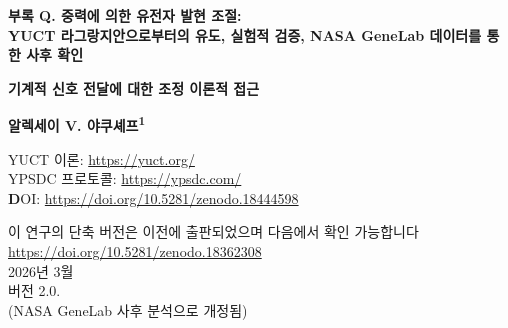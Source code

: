 \documentclass[12pt,a4paper]{article}
\theoremstyle{remark}
\begin{document}
	
	\begin{titlepage}
		\begin{center}
			\vspace*{1cm}
			
			\Huge\textbf{부록 Q. 중력에 의한 유전자 발현 조절: \\ YUCT 라그랑지안으로부터의 유도, 실험적 검증, NASA GeneLab 데이터를 통한 사후 확인}
			
			\vspace{0.5cm}
			\Large\textbf{기계적 신호 전달에 대한 조정 이론적 접근}
			
			\vspace{1.5cm}
			
			\Large\textbf{알렉세이 V. 야쿠셰프\textsuperscript{1}}
			
			YUCT 이론: \url{https://yuct.org/}\\
			YPSDC 프로토콜: \url{https://ypsdc.com/}\\
			
			\vspace{2cm}
			\textbf DOI: \url{https://doi.org/10.5281/zenodo.18444598}\\
			
			\vspace{1cm}
			
			\vspace{0cm}
			\large 
			이 연구의 단축 버전은 이전에 출판되었으며 다음에서 확인 가능합니다\\ \url{https://doi.org/10.5281/zenodo.18362308}\\
			\vspace{1cm}
			2026년 3월 \\ \large 버전 2.0.
			\\ (NASA GeneLab 사후 분석으로 개정됨)
			
			\vspace{2cm}
			

\end{center}
\end{titlepage}
\end{document}
